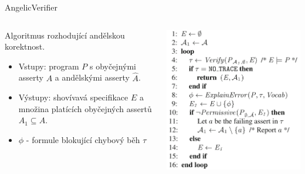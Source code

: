 \documentclass[11pt]{beamer}
\begin{document}
\begin{frame}{AngelicVerifier}
\begin{columns}

\begin{column}{0.5\textwidth}
Algoritmus rozhodující andělskou korektnost.
\begin{itemize}
\pause \item Vstupy: program $P$ s obyčejnými asserty $A$ a andělskými asserty $\hat{A}$.
\pause \item Výstupy: shovívavá specifikace $E$ a množina platících obyčejných assertů $A_1 \subseteq A$.
\pause \item $\phi$ - formule blokující chybový běh $\tau$
\end{itemize}
\end{column}


\begin{column}{0.5\textwidth}
\pause \includegraphics[width=0.9\linewidth]{img/angelicVerifyShort.png}
\end{column}


\end{columns}
\end{frame}
\end{document}
